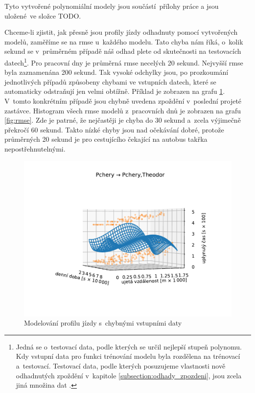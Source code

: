 \bigbreak

Tyto vytvořené polynomiální modely jsou součástí přílohy práce a jsou uložené ve složce TODO.

\bigbreak

Chceme-li zjistit, jak přesně jsou profily jízdy odhadnuty pomocí vytvořených modelů, zaměříme se na \gls{rmse} u~každého modelu. Tato chyba nám říká, o~kolik sekund se v~průměrném případě náš odhad plete od skutečnosti na testovacích datech\footnote{Jedná se o~testovací data, podle kterých se určil nejlepší stupeň polynomu. Kdy vstupní data pro funkci trénování modelu byla rozdělena na trénovací a~testovací. Testovací data, podle kterých posuzujeme vlastnosti nově odhadnutých zpoždění v~kapitole \ref{subsection:odhady_zpozdeni}, jsou zcela jiná množina dat \citep[viz][Strana 365, validation set a~test set]{Ripley96}.}. Pro pracovní dny je průměrná \gls{rmse} necelých 20 sekund. Nejvyšší \gls{rmse} byla zaznamenána 200 sekund. Tak vysoké odchylky jsou, po prozkoumání jednotlivých případů způsobeny chybami ve vstupních datech, které se automaticky odstraňují jen velmi obtížně. Příklad je zobrazen na grafu \ref{fig:chyba_zpozdeni_v_posledni_zastavce}. V~tomto konkrétním případě jsou chybně uvedena zpoždění v~poslední projeté zastávce. Histogram všech \gls{rmse} modelů z~pracovních dnů je zobrazen na grafu \ref{fig:rmse}. Zde je patrné, že nejčastěji je chyba do 30 sekund a~zcela výjimečně překročí 60 sekund. Takto nízké chyby jsou nad očekávání dobré, protože průměrných 20 sekund je pro cestujícího čekající na autobus takřka nepostřehnutelnými.


\begin{figure}
   \centering
 \includegraphics[width=\linewidth]{../img/134_135}
 \caption{Modelování profilu jízdy s~chybnými vstupními daty}
 \label{fig:chyba_zpozdeni_v_posledni_zastavce}
\end{figure}


